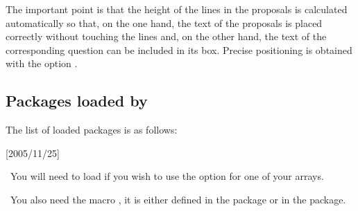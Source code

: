 The important point is that the height of the lines in the proposals is calculated automatically so that, on the one hand, the text of the proposals is placed correctly without touching the lines and, on the other hand, the text of the corresponding question can be included in its box. Precise positioning is obtained with the option .

\subsection{Packages loaded by }
The list of loaded packages is as follows:

\begin{tkzexample}
  \RequirePackage{xkeyval}[2005/11/25]
  \RequirePackage{calc}
  \RequirePackage{ifthen,forloop}
  \RequirePackage{array}
  \RequirePackage{multirow}
  \RequirePackage{pifont}
\end{tkzexample}


\tkzHandBomb\ You will need to load  if you wish to use the  option for one of your arrays.

\tkzHandBomb\ You also need the macro , it is either defined in the package  or in the package.
\endinput